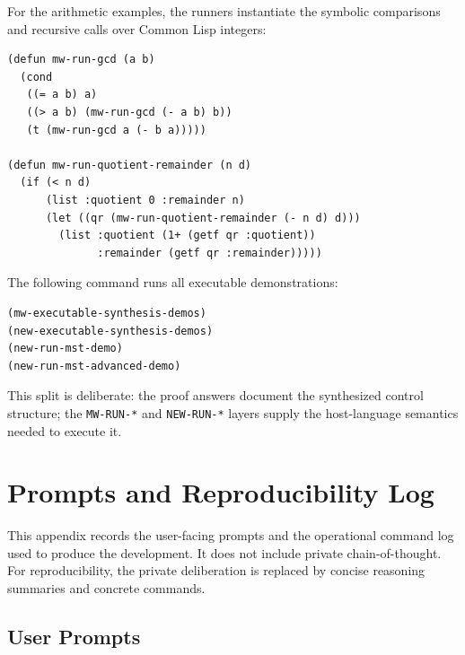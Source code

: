 \documentclass[runningheads]{llncs}
\begin{document}
For the arithmetic examples, the runners instantiate the symbolic comparisons
and recursive calls over Common Lisp integers:
\begin{lstlisting}
(defun mw-run-gcd (a b)
  (cond
   ((= a b) a)
   ((> a b) (mw-run-gcd (- a b) b))
   (t (mw-run-gcd a (- b a)))))

(defun mw-run-quotient-remainder (n d)
  (if (< n d)
      (list :quotient 0 :remainder n)
      (let ((qr (mw-run-quotient-remainder (- n d) d)))
        (list :quotient (1+ (getf qr :quotient))
              :remainder (getf qr :remainder)))))
\end{lstlisting}
The following command runs all executable demonstrations:
\begin{lstlisting}
(mw-executable-synthesis-demos)
(new-executable-synthesis-demos)
(new-run-mst-demo)
(new-run-mst-advanced-demo)
\end{lstlisting}
This split is deliberate: the proof answers document the synthesized control
structure; the \texttt{MW-RUN-*} and \texttt{NEW-RUN-*} layers supply the
host-language semantics needed to execute it.

\appendix

\section{Prompts and Reproducibility Log}

This appendix records the user-facing prompts and the operational command log
used to produce the development.  It does not include private chain-of-thought.
For reproducibility, the private deliberation is replaced by concise reasoning
summaries and concrete commands.

\subsection{User Prompts}
\end{document}
